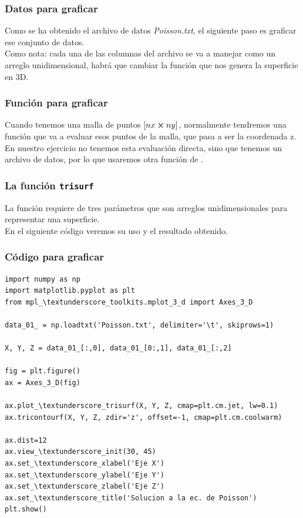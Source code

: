 \begin{frame}
\frametitle{Datos para graficar}
Como se ha obtenido el archivo de datos \emph{Poisson.txt}, el siguiente paso es graficar ese conjunto de datos.
\\
\bigskip
\pause
Como nota: cada una de las columnas del archivo se va a manejar como un arreglo unidimensional, habrá que cambiar la función que nos genera la superficie en 3D.
\end{frame}
\begin{frame}
\frametitle{Función para graficar}
Cuando tenemos una malla de puntos $[nx \cp ny]$, normalmente tendremos una función que va a evaluar esos puntos de la malla, que pasa a ser la coordenada z.
\\
\bigskip
En nuestro ejercicio no tenemos esta evaluación directa, sino que tenemos un archivo de datos, por lo que usaremos otra función de .
\end{frame}
\begin{frame}
\frametitle{La función \texttt{trisurf}}
La función  requiere de tres parámetros que son arreglos unidimensionales para representar una superficie.
\\
\bigskip
\pause
En el siguiente código veremos su uso y el resultado obtenido.
\end{frame}
\begin{frame}
\frametitle{Código para graficar}
\begin{lstlisting}[caption=Código para graficar la solución, style=FormattedNumber, basicstyle=\linespread{1.1}\ttfamily=\small, columns=fullflexible]
import numpy as np
import matplotlib.pyplot as plt
from mpl_\textunderscore_toolkits.mplot_3_d import Axes_3_D

data_01_ = np.loadtxt('Poisson.txt', delimiter='\t', skiprows=1)

X, Y, Z = data_01_[:,0], data_01_[0:,1], data_01_[:,2]

fig = plt.figure()
ax = Axes_3_D(fig)

ax.plot_\textunderscore_trisurf(X, Y, Z, cmap=plt.cm.jet, lw=0.1)
ax.tricontourf(X, Y, Z, zdir='z', offset=-1, cmap=plt.cm.coolwarm)

ax.dist=12
ax.view_\textunderscore_init(30, 45)
ax.set_\textunderscore_xlabel('Eje X')
ax.set_\textunderscore_ylabel('Eje Y')
ax.set_\textunderscore_zlabel('Eje Z')
ax.set_\textunderscore_title('Solucion a la ec. de Poisson')
plt.show()
\end{lstlisting}
\end{frame}
